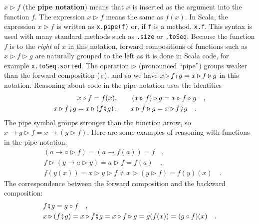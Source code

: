 $x\triangleright f$ (the \textbf{pipe notation})
means that $x$ is inserted as the argument into the function $f$.
The expression $x\triangleright f$ means the same as $f(x)$. In
Scala, the expression $x\triangleright f$ is written as \lstinline!x.pipe(f)!
or, if \lstinline!f! is a method, \lstinline!x.f!. This syntax is
used with many standard methods such as \lstinline!.size! or \lstinline!.toSeq!.
Because the function $f$ is to the \emph{right} of $x$ in this notation,
forward compositions of functions such as $x\triangleright f\triangleright g$
are naturally grouped to the left as it is done in Scala code, for
example \lstinline!x.toSeq.sorted!. The operation $\triangleright$
(pronounced ``pipe'') groups weaker than the forward composition
($\bef$), and so we have $x\triangleright f\bef g=x\triangleright f\triangleright g$
in this notation. Reasoning about code in the pipe notation uses the
identities
\begin{align*}
x\triangleright f=f(x),\quad\quad & \left(x\triangleright f\right)\triangleright g=x\triangleright f\triangleright g\quad,\\
x\triangleright f\bef g=x\triangleright\left(f\bef g\right),\quad\quad & x\triangleright f\triangleright g=x\triangleright f\bef g\quad.
\end{align*}
The pipe symbol groups stronger than the function arrow, so $x\rightarrow y\triangleright f=x\rightarrow(y\triangleright f)$.
Here are some examples of reasoning with functions in the pipe notation:
\begin{align*}
 & \left(a\rightarrow a\triangleright f\right)=\left(a\rightarrow f(a)\right)=f\quad,\\
 & f\triangleright\left(y\rightarrow a\triangleright y\right)=a\triangleright f=f(a)\quad,\\
 & f(y(x))=x\triangleright y\triangleright f\neq x\triangleright\left(y\triangleright f\right)=f(y)(x)\quad.
\end{align*}
The correspondence between the forward composition and the backward
composition:
\begin{align*}
 & f\bef g=g\circ f\quad,\\
 & x\triangleright(f\bef g)=x\triangleright f\bef g=x\triangleright f\triangleright g=g(f(x))=(g\circ f)(x)\quad.
\end{align*}

